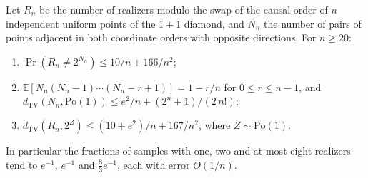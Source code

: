 \begin{theorem}\label{thm:realizers}
Let $R_n$ be the number of realizers modulo the swap of the causal order of $n$ independent uniform points of the $1{+}1$ diamond, and $N_n$ the number of pairs of points adjacent in both coordinate orders with opposite directions. For $n\ge20$:
\begin{enumerate}[label=(\alph*),leftmargin=2em]
\item $\Pr(R_n\ne2^{N_n})\le 10/n+166/n^2$;
\item $\mathbb E[N_n(N_n-1)\cdots(N_n-r+1)]=1-r/n$ for $0\le r\le n-1$, and $d_{\mathrm{TV}}(N_n,\mathrm{Po}(1))\le e^2/n+(2^n+1)/(2\,n!)$;
\item $d_{\mathrm{TV}}(R_n,2^{Z})\le(10+e^2)/n+167/n^2$, where $Z\sim\mathrm{Po}(1)$.
\end{enumerate}
In particular the fractions of samples with one, two and at most eight realizers tend to $e^{-1}$, $e^{-1}$ and $\tfrac83e^{-1}$, each with error $O(1/n)$. 
\end{theorem}
